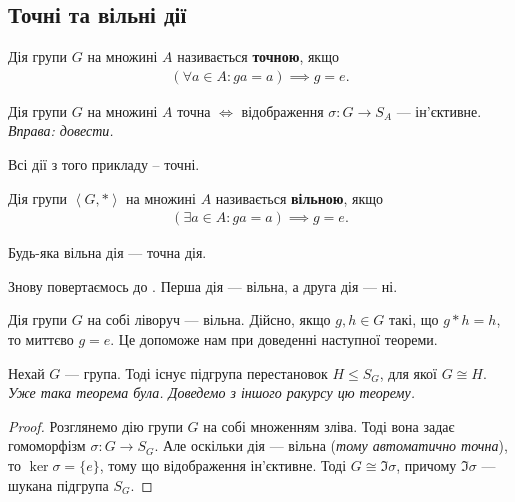 \documentclass{math_library}
\begin{document}
\subsection{Точні та вільні дії}
\begin{definition}
Дія групи $G$ на множині $A$ називається \textbf{точною}, якщо
\begin{align*}
(\forall a \in A: ga = a) \implies g = e.
\end{align*}
\end{definition}

\begin{proposition}
Дія групи $G$ на множині $A$ точна $\iff$ відображення $\sigma \colon G \to S_A$ --- ін'єктивне.\\
\textit{Вправа: довести.}
\end{proposition}

\begin{example}
Всі дії з того прикладу -- точні.
\end{example}

\begin{definition}
Дія групи $\left< G,*\right>$ на множині $A$ називається \textbf{вільною}, якщо
\begin{align*}
(\exists a \in A: ga = a) \implies g = e.
\end{align*}
\end{definition}

\begin{remark}
Будь-яка вільна дія --- точна дія.
\end{remark}

\begin{example}
Знову повертаємось до . Перша дія --- вільна, а друга дія --- ні.
\end{example}

\begin{example}
Дія групи $G$ на собі ліворуч --- вільна. Дійсно, якщо $g,h \in G$ такі, що $g*h = h$, то миттєво $g = e$. Це допоможе нам при доведенні наступної теореми.
\end{example}

\begin{theorem}
Нехай $G$ --- група. Тоді існує підгрупа перестановок $H \leq S_G$, для якої $G \cong H$.\\
\textit{Уже така теорема була. Доведемо з іншого ракурсу цю теорему.}
\end{theorem}

\begin{proof}
Розглянемо дію групи $G$ на собі множенням зліва. Тоді вона задає гомоморфізм $\sigma \colon G \to S_G$. Але оскільки дія --- вільна (\textit{тому автоматично точна}), то $\ker \sigma = \{e\}$, тому що відображення ін'єктивне. Тоді $G \cong \Im \sigma$, причому $\Im \sigma$ --- шукана підгрупа $S_G$.
\end{proof}
\end{document}
